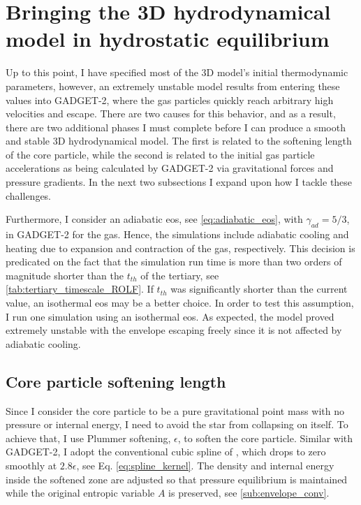 \section{Bringing the 3D hydrodynamical model in hydrostatic equilibrium}

Up to this point, I have specified most of the 3D model's initial thermodynamic parameters,  however, an extremely unstable model results from entering these values into GADGET-2, where the gas particles quickly reach arbitrary high velocities and escape. There are two causes for this behavior, and as a result, there are two additional phases I must complete before I can produce a smooth and stable 3D hydrodynamical model. The first is related to the softening length of the core particle, while the second is related to the initial gas particle accelerations as being calculated by GADGET-2 via gravitational forces and pressure gradients. In the next two subsections I expand upon how I tackle these challenges. 

Furthermore, I consider an adiabatic \ac{eos}, see \cref{eq:adiabatic_eos}, with $\gamma_{ad} = 5/3$, in GADGET-2 for the gas. Hence, the simulations include adiabatic cooling and heating due to expansion and contraction of the gas, respectively. This decision is predicated on the fact that the simulation run time is more than two orders of magnitude shorter than the $t_{th}$ of the tertiary, see \cref{tab:tertiary_timescale_ROLF}. If $t_{th}$ was significantly shorter than the current value, an isothermal \ac{eos} may be a better choice. In order to test this assumption, I run one simulation using an isothermal \ac{eos}. As expected, the model proved extremely unstable with the envelope escaping freely since it is not affected by adiabatic cooling.

\subsection{Core particle softening length}

Since I consider the core particle to be a pure gravitational point mass with no pressure or internal energy, I need to avoid the star from collapsing on itself.
To achieve that, I use Plummer softening, $\epsilon$, to soften the core particle. Similar with GADGET-2, I adopt the conventional cubic spline of \cite{monaghan1985refined}, which drops to zero smoothly at $2.8 \epsilon$, see Eq. \eqref{eq:spline_kernel}. The density and internal energy inside the softened zone are adjusted so that pressure equilibrium is maintained while the original entropic variable $A$ is preserved, see \cref{sub:envelope_conv}. 


